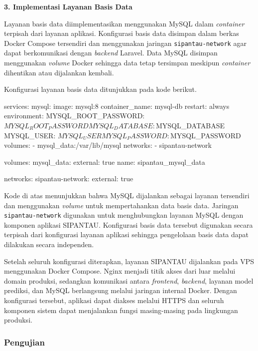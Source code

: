 \vspace{0.5em}
\noindent\textbf{3. Implementasi Layanan Basis Data}
\vspace{0.5em}

Layanan basis data diimplementasikan menggunakan MySQL dalam \textit{container} terpisah dari layanan aplikasi. Konfigurasi basis data disimpan dalam berkas Docker Compose tersendiri dan menggunakan jaringan \texttt{sipantau-network} agar dapat berkomunikasi dengan \textit{backend} Laravel. Data MySQL disimpan menggunakan \textit{volume} Docker sehingga data tetap tersimpan meskipun \textit{container} dihentikan atau dijalankan kembali.

Konfigurasi layanan basis data ditunjukkan pada kode berikut.

\begin{code}
\begin{ignasicblock}
services:
  mysql:
    image: mysql:8
    container_name: mysql-db
    restart: always
    environment:
      MYSQL_ROOT_PASSWORD: ${MYSQL_ROOT_PASSWORD}
      MYSQL_DATABASE: ${MYSQL_DATABASE}
      MYSQL_USER: ${MYSQL_USER}
      MYSQL_PASSWORD: ${MYSQL_PASSWORD}
    volumes:
      - mysql_data:/var/lib/mysql
    networks:
      - sipantau-network

volumes:
  mysql_data:
    external: true
    name: sipantau_mysql_data

networks:
  sipantau-network:
    external: true
\end{ignasicblock}
\end{code}

Kode di atas menunjukkan bahwa MySQL dijalankan sebagai layanan tersendiri dan menggunakan \textit{volume} untuk mempertahankan data basis data. Jaringan \texttt{sipantau-network} digunakan untuk menghubungkan layanan MySQL dengan komponen aplikasi SIPANTAU. Konfigurasi basis data tersebut digunakan secara terpisah dari konfigurasi layanan aplikasi sehingga pengelolaan basis data dapat dilakukan secara independen.

Setelah seluruh konfigurasi diterapkan, layanan SIPANTAU dijalankan pada VPS menggunakan Docker Compose. Nginx menjadi titik akses dari luar melalui domain produksi, sedangkan komunikasi antara \textit{frontend}, \textit{backend}, layanan model prediksi, dan MySQL berlangsung melalui jaringan internal Docker. Dengan konfigurasi tersebut, aplikasi dapat diakses melalui HTTPS dan seluruh komponen sistem dapat menjalankan fungsi masing-masing pada lingkungan produksi.

\subsubsection{Pengujian}

